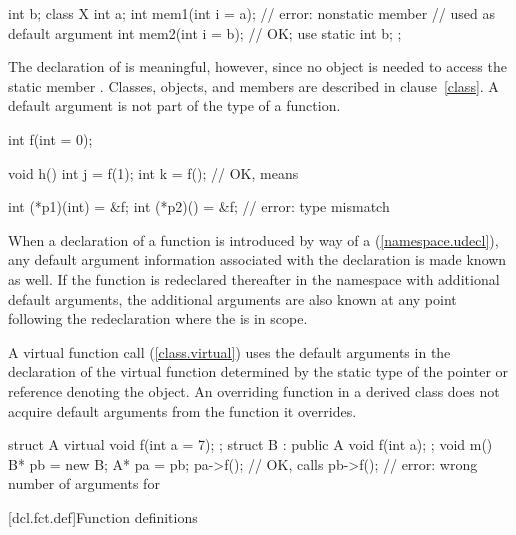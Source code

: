 \begin{codeblock}
int b;
class X {
    int a;
    int mem1(int i = a);        // error: nonstatic member 
                                // used as default argument
    int mem2(int i = b);        // OK;  use 
    static int b;
};
\end{codeblock}

The declaration of
is meaningful, however, since no object is needed to access the static member
.
Classes, objects, and members are described in clause~\ref{class}.
\exitexample
A default argument is not part of the
type of a function.
\enterexample

\begin{codeblock}
int f(int = 0);

void h()
{
    int j = f(1);
    int k = f();                // OK, means 
}

int (*p1)(int) = &f;
int (*p2)() = &f;               // error: type mismatch
\end{codeblock}
\exitexampleb
When a declaration of a function is introduced by way of a
(\ref{namespace.udecl}), any default argument information associated
with the declaration is made known as well.
If the function is redeclared
thereafter in the namespace with additional default arguments,
the additional arguments are also known at any point following
the redeclaration where the
is in scope.

\pnum
{}%
A virtual function call (\ref{class.virtual}) uses the default
arguments in the declaration of the virtual function determined
by the static type of the pointer or reference denoting the
object.
An overriding function in a derived class does not
acquire default arguments from the function it overrides.
\enterexample

\begin{codeblock}
struct A {
    virtual void f(int a = 7);
};
struct B : public A {
    void f(int a);
};
void m()
{
    B* pb = new B;
    A* pa = pb;
    pa->f();			// OK, calls 
    pb->f();			// error: wrong number of arguments for 
}
\end{codeblock}
\exitexampleb%
%

[dcl.fct.def]{Function definitions}%

